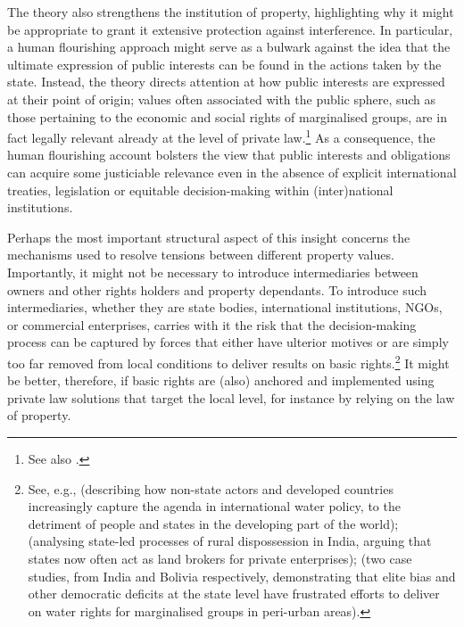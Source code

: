 The theory also strengthens the institution of property, highlighting why it might be appropriate to 
grant it extensive protection against interference. In particular, a human flourishing approach might serve as a bulwark against the idea that the ultimate expression of public interests can be found in the actions taken by the state. Instead, the theory directs attention at how public interests are expressed at their point of origin; values often associated with the public sphere, such as those pertaining to the economic and social rights of marginalised groups, are in fact legally relevant already at the level of private law.\footnote{See also \cite[1295-1296]{alexander14}.} As a consequence, the human flourishing account bolsters the view that public interests and obligations can acquire some justiciable relevance even in the absence of explicit international treaties, legislation or equitable decision-making within (inter)national institutions. 

Perhaps the most important structural aspect of this insight concerns the mechanisms used to resolve tensions between different property values. Importantly, it might not be necessary to introduce intermediaries between owners and other rights holders and property dependants. To introduce such intermediaries, whether they are state bodies, international institutions, NGOs, or commercial enterprises, carries with it the risk that the decision-making process can be captured by forces that either have ulterior motives or are simply too far removed from local conditions to deliver results on basic rights.\footnote{See, e.g., \cite{cullet13} (describing how non-state actors and developed countries increasingly capture the agenda in international water policy, to the detriment of people and states in the developing part of the world); \cite{levien13} (analysing state-led processes of rural dispossession in India, arguing that states now often act as land brokers for private enterprises); \cite{mehta14} (two case studies, from India and Bolivia respectively, demonstrating that elite bias and other democratic deficits at the state level have frustrated efforts to deliver on water rights for marginalised groups in peri-urban areas).} It might be better, therefore, if basic rights are (also) anchored and implemented using private law solutions that target the local level, for instance by relying on the law of property.



